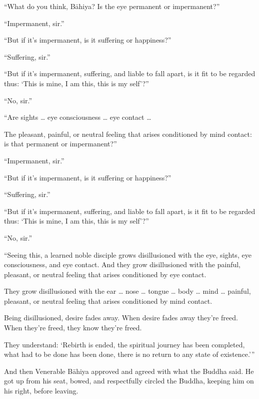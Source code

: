 \documentclass[12pt,openany]{book}%
\begin{document}
“What do you think, \textsanskrit{Bāhiya}? Is the eye permanent or impermanent?” 

“Impermanent, sir.” 

“But if it’s impermanent, is it suffering or happiness?” 

“Suffering, sir.” 

“But if it’s impermanent, suffering, and liable to fall apart, is it fit to be regarded thus: ‘This is mine, I am this, this is my self’?” 

“No, sir.” 

“Are sights … eye consciousness … eye contact … 

The pleasant, painful, or neutral feeling that arises conditioned by mind contact: is that permanent or impermanent?” 

“Impermanent, sir.” 

“But if it’s impermanent, is it suffering or happiness?” 

“Suffering, sir.” 

“But if it’s impermanent, suffering, and liable to fall apart, is it fit to be regarded thus: ‘This is mine, I am this, this is my self’?” 

“No, sir.” 

“Seeing this, a learned noble disciple grows disillusioned with the eye, sights, eye consciousness, and eye contact. And they grow disillusioned with the painful, pleasant, or neutral feeling that arises conditioned by eye contact. 

They grow disillusioned with the ear … nose … tongue … body … mind … painful, pleasant, or neutral feeling that arises conditioned by mind contact. 

Being disillusioned, desire fades away. When desire fades away they’re freed. When they’re freed, they know they’re freed. 

They understand: ‘Rebirth is ended, the spiritual journey has been completed, what had to be done has been done, there is no return to any state of existence.’” 

And then Venerable \textsanskrit{Bāhiya} approved and agreed with what the Buddha said. He got up from his seat, bowed, and respectfully circled the Buddha, keeping him on his right, before leaving. 
\end{document}
